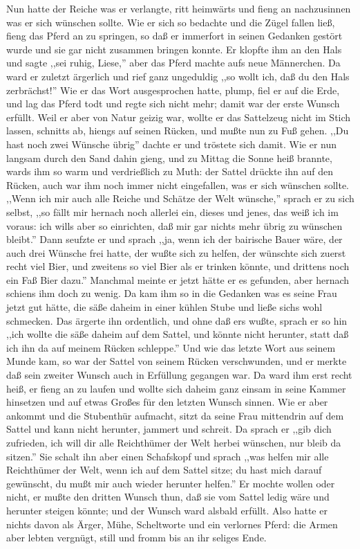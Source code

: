 \documentclass[10pt,a4paper]{article}
\begin{document}
\vskip 4pt
Nun hatte der Reiche was er verlangte, ritt heimwärts und fieng an nachzusinnen
was er sich wünschen sollte. Wie er sich so bedachte und die Zügel fallen ließ,
fieng das Pferd an zu springen, so daß er immerfort in seinen Gedanken gestört
wurde und sie gar nicht zusammen bringen konnte. Er klopfte ihm an den Hals und
sagte ,,sei ruhig, Liese,'' aber das Pferd machte aufs neue Männerchen. Da ward
er zuletzt ärgerlich und rief ganz ungeduldig ,,so wollt ich, daß du den Hals
zerbrächst!'' Wie er das Wort ausgesprochen hatte, plump, fiel er auf die Erde,
und lag das Pferd todt und regte sich nicht mehr; damit war der erste Wunsch
erfüllt. Weil er aber von Natur geizig war, wollte er das Sattelzeug nicht im
Stich lassen, schnitts ab, hiengs auf seinen Rücken, und mußte nun zu Fuß gehen.
,,Du hast noch zwei Wünsche übrig'' dachte er und tröstete sich damit. Wie er
nun langsam durch den Sand dahin gieng, und zu Mittag die Sonne heiß brannte,
wards ihm so warm und verdrießlich zu Muth: der Sattel drückte ihn auf den
Rücken, auch war ihm noch immer nicht eingefallen, was er sich wünschen sollte.
,,Wenn ich mir auch alle Reiche und Schätze der Welt wünsche,'' sprach er zu
sich selbst, ,,so fällt mir hernach noch allerlei ein, dieses und jenes, das
weiß ich im voraus: ich wills aber so einrichten, daß mir gar nichts mehr übrig
zu wünschen bleibt.'' Dann seufzte er und sprach ,,ja, wenn ich der bairische
Bauer wäre, der auch drei Wünsche frei hatte, der wußte sich zu helfen, der
wünschte sich zuerst recht viel Bier, und zweitens so viel Bier als er trinken
könnte, und drittens noch ein Faß Bier dazu.'' Manchmal meinte er jetzt hätte
er es gefunden, aber hernach schiens ihm doch zu wenig. Da kam ihm so in die
Gedanken was es seine Frau jetzt gut hätte, die säße daheim in einer kühlen
Stube und ließe sichs wohl schmecken. Das ärgerte ihn ordentlich, und ohne daß
ers wußte, sprach er so hin ,,ich wollte die säße daheim auf dem Sattel, und
könnte nicht herunter, statt daß ich ihn da auf meinem Rücken schleppe.'' Und
wie das letzte Wort aus seinem Munde kam, so war der Sattel von seinem Rücken
verschwunden, und er merkte daß sein zweiter Wunsch auch in Erfüllung gegangen
war. Da ward ihm erst recht heiß, er fieng an zu laufen und wollte sich daheim
ganz einsam in seine Kammer hinsetzen und auf etwas Großes für den letzten
Wunsch sinnen. Wie er aber ankommt und die Stubenthür aufmacht, sitzt da seine
Frau mittendrin auf dem Sattel und kann nicht herunter, jammert und schreit. Da
sprach er ,,gib dich zufrieden, ich will dir alle Reichthümer der Welt herbei
wünschen, nur bleib da sitzen.'' Sie schalt ihn aber einen Schafskopf und sprach
,,was helfen mir alle Reichthümer der Welt, wenn ich auf dem Sattel sitze; du
hast mich darauf gewünscht, du mußt mir auch wieder herunter helfen.'' Er mochte
wollen oder nicht, er mußte den dritten Wunsch thun, daß sie vom Sattel ledig
wäre und herunter steigen könnte; und der Wunsch ward alsbald erfüllt. Also
hatte er nichts davon als Ärger, Mühe, Scheltworte und ein verlornes Pferd: die
Armen aber lebten vergnügt, still und fromm bis an ihr seliges Ende.
\end{document}
